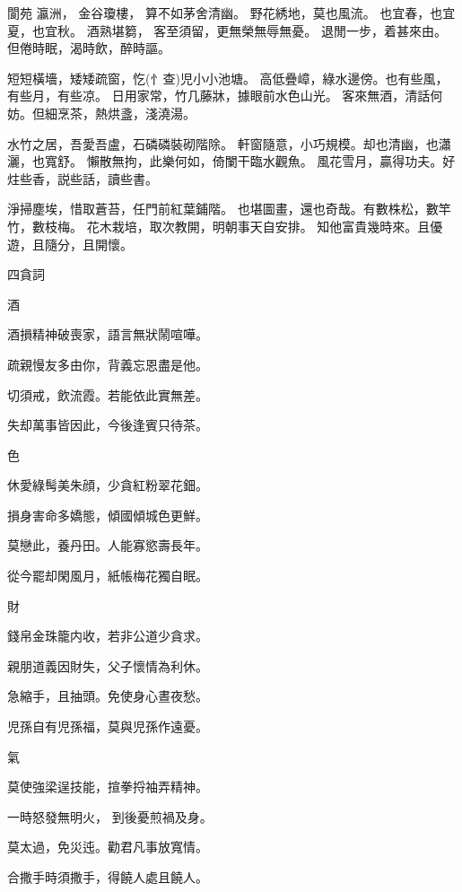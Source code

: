 \begin{showcontents}{}
閬苑
瀛洲，
金谷瓊樓， 算不如茅舍清幽。
野花綉地，莫也風流。
也宜春，也宜夏，也宜秋。
酒熟堪篘，%
客至須留，更無榮無辱無憂。
退閒一步，着甚來由。
但倦時眠，渴時飲，醉時謳。

短短橫墻，矮矮疏窗，忔(忄查)児小小池塘。
高低疊嶂，綠水邊傍。也有些風，有些月，有些凉。
日用家常，竹几藤牀，據眼前水色山光。
客來無酒，清話何妨。但細烹茶，熱烘盞，淺澆湯。

水竹之居，吾愛吾盧，石磷磷裝砌階除。
軒窗隨意，小巧規模。却也清幽，也瀟灑，也寬舒。
懶散無拘，此樂何如，倚闌干臨水觀魚。
風花雪月，贏得功夫。好炷些香，説些話，讀些書。

淨掃塵埃，惜取蒼苔，任門前紅葉鋪階。
也堪圖畫，還也奇哉。有數株松，數竿竹，數枝梅。
花木栽培，取次教開，明朝事天自安排。
知他富貴幾時來。且優遊，且隨分，且開懷。



四貪詞

酒

酒損精神破喪家，語言無狀鬧喧嘩。

疏親慢友多由你，背義忘恩盡是他。

切須戒，飲流霞。若能依此實無差。

失却萬事皆因此，今後逢賓只待茶。

色

休愛綠髩美朱顔，少貪紅粉翠花鈿。

損身害命多嬌態，傾國傾城色更鮮。

莫戀此，養丹田。人能寡慾壽長年。

從今罷却閑風月，紙帳梅花獨自眠。

財

錢帛金珠籠内收，若非公道少貪求。

親朋道義因財失，父子懷情為利休。

急縮手，且抽頭。免使身心晝夜愁。

児孫自有児孫福，莫與児孫作遠憂。

氣

莫使強梁逞技能，揎拳捋袖弄精神。

一時怒發無明火，
到後憂煎禍及身。

莫太過，免災迍。勸君凡事放寬情。

合撒手時須撒手，得饒人處且饒人。



\end{showcontents}

